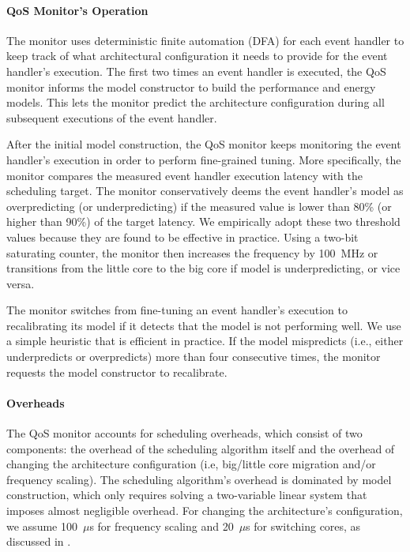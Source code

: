 \paragraph{QoS Monitor's Operation} The monitor uses deterministic finite automation (DFA) for each event handler to keep track of what architectural configuration it needs to provide for the event handler's execution. The first two times an event handler is executed, the QoS monitor informs the model constructor to build the performance and energy models. This lets the monitor predict the architecture configuration during all subsequent executions of the event handler.

After the initial model construction, the QoS monitor keeps monitoring the event handler's execution in order to perform fine-grained tuning. More specifically, the monitor compares the measured event handler execution latency with the scheduling target. The monitor conservatively deems the event handler's model as overpredicting (or underpredicting) if the measured value is lower than 80\% (or higher than 90\%) of the target latency. We empirically adopt these two threshold values because they are found to be effective in practice. Using a two-bit saturating counter, the monitor then increases the frequency by 100~MHz or transitions from the little core to the big core if model is underpredicting, or vice versa.

The monitor switches from fine-tuning an event handler's execution to recalibrating its model if it detects that the model is not performing well. We use a simple heuristic that is efficient in practice. If the model mispredicts (i.e., either underpredicts or overpredicts) more than four consecutive times, the monitor requests the model constructor to recalibrate.

\paragraph{Overheads} The QoS monitor accounts for scheduling overheads, which consist of two components: the overhead of the scheduling algorithm itself and the overhead of changing the architecture configuration (i.e, big/little core migration and/or frequency scaling). The scheduling algorithm's overhead is dominated by model construction, which only requires solving a two-variable linear system that imposes almost negligible overhead. For changing the architecture's configuration, we assume 100~$\mu$s for frequency scaling and 20~$\mu$s for switching cores, as discussed in .

